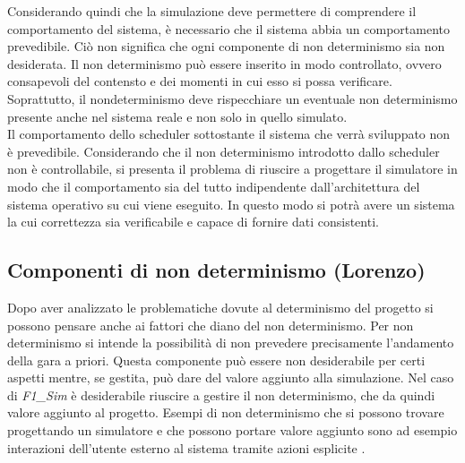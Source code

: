 Considerando quindi che la simulazione deve permettere di comprendere il
comportamento del sistema, è necessario che il sistema abbia 
un comportamento prevedibile. Ciò non significa che ogni componente di non
determinismo sia non desiderata. Il non determinismo
può essere inserito in modo controllato, ovvero consapevoli del contensto e dei
momenti in cui esso si possa verificare. Soprattutto,
il nondeterminismo deve rispecchiare un eventuale non determinismo presente
anche nel sistema reale e non solo in quello simulato.\\
Il comportamento dello scheduler sottostante il sistema che verrà sviluppato non
è prevedibile. Considerando che il non determinismo
introdotto dallo scheduler non è controllabile, si presenta
il problema di riuscire a progettare il simulatore in modo
che il comportamento sia del tutto indipendente dall'architettura del sistema
operativo su cui viene eseguito. In questo
modo si potrà avere un sistema la cui correttezza sia verificabile e capace di
fornire dati consistenti.
\subsection{Componenti di non determinismo (Lorenzo)}
\label{non_determinismo}
Dopo aver analizzato le problematiche dovute al determinismo del progetto si
possono pensare anche ai fattori che diano del non determinismo.
Per non determinismo si intende la possibilit\`{a} di non prevedere precisamente
l'andamento della gara a priori. Questa componente pu\`{o} essere non
desiderabile per certi aspetti mentre, se gestita, pu\`{o} dare del valore
aggiunto alla simulazione. Nel caso di \emph{F1\_Sim} \`{e} desiderabile
riuscire a gestire il non determinismo, che da quindi valore aggiunto al
progetto.
Esempi di non determinismo che si possono trovare progettando un simulatore e
che possono portare valore aggiunto sono ad esempio interazioni dell'utente
esterno al sistema tramite azioni esplicite .
